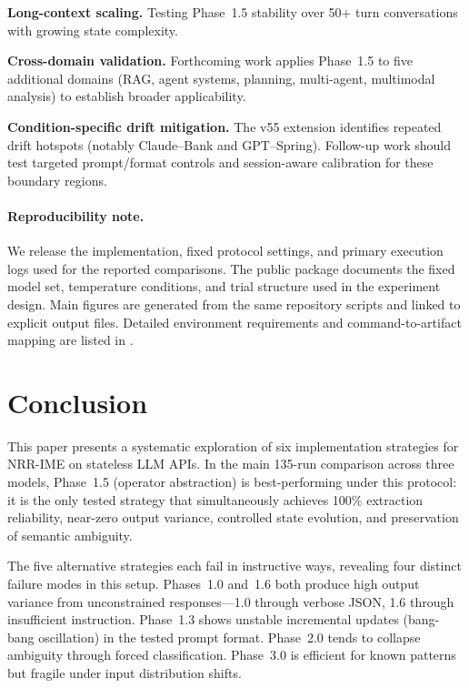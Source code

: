 \documentclass[11pt,a4paper]{article}
\begin{document}
\textbf{Long-context scaling.} Testing Phase~1.5 stability over 50+ turn
conversations with growing state complexity.

\textbf{Cross-domain validation.} Forthcoming work applies Phase~1.5
to five additional domains (RAG, agent systems, planning, multi-agent,
multimodal analysis) to establish broader applicability.

\textbf{Condition-specific drift mitigation.} The v55 extension identifies
repeated drift hotspots (notably Claude--Bank and GPT--Spring). Follow-up
work should test targeted prompt/format controls and session-aware calibration
for these boundary regions.

\paragraph{Reproducibility note.}
We release the implementation, fixed protocol settings, and primary execution logs used for the reported comparisons.
The public package documents the fixed model set, temperature conditions, and trial structure used in the experiment design.
Main figures are generated from the same repository scripts and linked to explicit output files.
Detailed environment requirements and command-to-artifact mapping are listed in
.

\section{Conclusion}
\label{sec:conclusion}

This paper presents a systematic exploration of six implementation strategies
for NRR-IME on stateless LLM APIs. In the main 135-run comparison across three
models, Phase~1.5 (operator abstraction) is best-performing under this protocol:
it is the only tested strategy that simultaneously achieves 100\% extraction
reliability, near-zero output variance, controlled state evolution, and
preservation of semantic ambiguity.

The five alternative strategies each fail in instructive ways, revealing four
distinct failure modes in this setup. Phases~1.0 and~1.6 both produce high
output variance from unconstrained responses---1.0 through verbose JSON, 1.6
through insufficient instruction. Phase~1.3 shows unstable incremental updates
(bang-bang oscillation) in the tested prompt format. Phase~2.0 tends to collapse
ambiguity through forced classification. Phase~3.0 is efficient for known
patterns but fragile under input distribution shifts.
\end{document}

